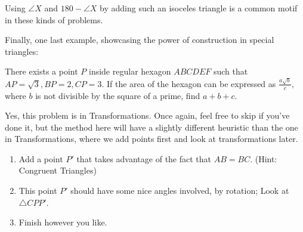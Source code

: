 \documentclass[11pt]{article}
\begin{document}
Using $\angle X$ and $180-\angle X$ by adding such an isoceles triangle is a common motif in these kinds of problems.


Finally, one last example, showcasing the power of construction in special triangles:
\begin{exam}
There exists a point $P$ inside regular hexagon $ABCDEF$ such that $AP=\sqrt{3},BP=2,CP=3.$ If the area of the hexagon can be expressed as $\frac{a\sqrt{b}}{c},$ where $b$ is not divisible by the square of a prime, find $a+b+c.$
\end{exam}
Yes, this problem is in Transformations. Once again, feel free to skip if you've done it, but the method here will have a slightly different heuristic than the one in Transformations, where we add points first and look at transformations later.

\begin{walk}
    \begin{enumerate}
        \item Add a point $P'$ that takes advantage of the fact that $AB = BC$. (Hint: Congruent Triangles)
        \item This point $P'$ should have some nice angles involved, by rotation; Look at $\triangle CPP'$. 
        \item Finish however you like.
    \end{enumerate}
\end{walk}

\problems
\end{document}
